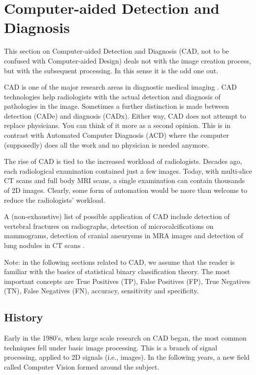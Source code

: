 \section{Computer-aided Detection and Diagnosis}
This section on Computer-aided Detection and Diagnosis (CAD, not to be
confused with Computer-aided Design) deals not with the image creation process,
but with the subsequent processing. In this sense it is the odd one out.

CAD is one of the major research areas in diagnostic medical imaging
\cite{cadhistory, suetens}. CAD technologies help radiologists with the actual
detection and diagnosis of pathologies in the image. Sometimes a further
distinction is made between detection (CADe) and diagnosis (CADx). Either way,
CAD does not attempt to replace physicians. You can think of it more as a second
opinion. This is in contrast with Automated Computer Diagnosis (ACD) where the
computer (supposedly) does all the work and no physician is needed anymore.

The rise of CAD is tied to the increased workload of radiologists. Decades ago,
each radiological examination contained just a few images. Today, with
multi-slice CT scans and full body MRI scans, a single examination can contain
thousands of 2D images. Clearly, some form of automation would be more than
welcome to reduce the radiologists' workload.

A (non-exhaustive) list of possible application of CAD include detection of
vertebral fractures on radiographs, detection of microcalcifications on
mammograms, detection of cranial aneurysms in MRA images and detection of lung
nodules in CT scans \cite{cadhistory}.

Note: in the following sections related to CAD, we assume that the reader is
familiar with the basics of statistical binary classification theory. The most
important concepts are True Positives (TP), False Positives (FP), True Negatives
(TN), False Negatives (FN), accuracy, sensitivity and specificity.



\subsection{History}
Early in the 1980's, when large scale research on CAD began, the most common
techniques fell under basic image processing. This is a branch of signal
processing, applied to 2D signals (i.e., images). In the following years, a new
field called Computer Vision formed around the subject. 

